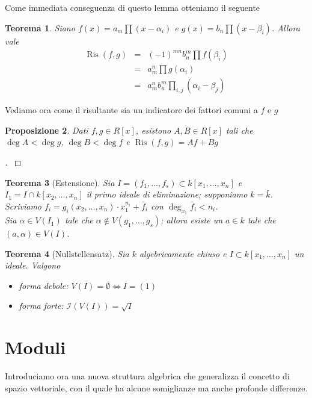 \documentclass[a4paper,10pt]{article}
\theoremstyle{plain}
\newtheorem{thm}{Teorema}[section]
\newtheorem{prop}[thm]{Proposizione}
\theoremstyle{definition}
\newenvironment{myproof}[1][\proofname]{%
  \begin{proof}[#1]$ $\par\nobreak\ignorespaces
}{%
  \qedhere
  \end{proof}
}
\DeclareMathOperator{\Ris}{Ris}
\begin{document}
Come immediata conseguenza di questo lemma otteniamo il seguente
\begin{thm}
    Siano $f(x)=a_m\prod(x-\alpha_i)$ e $g(x)=b_n\prod(x-\beta_i)$. Allora vale
    $$\begin{array}{lll} \Ris(f,g)&=& \displaystyle(-1)^{mn}b_n^m\prod f(\beta_i)\\
    &=&\displaystyle a_m^n\prod g(\alpha_i) \\
    &=&\displaystyle a_m^nb_n^m\prod_{i,j}(\alpha_i-\beta_j) \end{array}$$
\end{thm}

Vediamo ora come il risultante sia un indicatore dei fattori comuni a $f$ e $g$
\begin{prop}
    Dati $f,g\in R[x]$, esistono $A,B\in R[x]$ tali che $\deg A<\deg g$, $\deg B<\deg f$ e $\Ris(f,g)=Af+Bg$
\end{prop}
\begin{myproof}

\end{myproof}

\begin{thm}[Estensione]
    Sia $I=(f_1,\dots,f_s)\subset k[x_1,\dots,x_n]$ e $I_1=I\cap k[x_2,\dots,x_n]$ il primo ideale di eliminazione; supponiamo $k=\bar k$. Scriviamo $f_i=g_i(x_2,\dots,x_n)\cdot x_1^{n_i}+\bar f_i$ con $\deg_{x_1}\bar f_i<n_i$.\\
    Sia $\alpha\in V(I_1)$ tale che $\alpha\not\in V(g_1,\dots,g_s)$; allora esiste un $a\in k$ tale che $(a,\alpha)\in V(I)$.
\end{thm}

\begin{thm}[Nullstellensatz]
    Sia $k$ algebricamente chiuso e $I\subset k[x_1,\dots,x_n]$ un ideale. Valgono
    \begin{itemize}
        \item forma debole: $V(I)=\emptyset\iff I=(1)$
        \item forma forte: $\mathcal I(V(I))=\sqrt I$
    \end{itemize}
\end{thm}




\section{Moduli}

Introduciamo ora una nuova struttura algebrica che generalizza il concetto di spazio vettoriale, con il quale ha alcune somiglianze ma anche profonde differenze.
\end{document}
